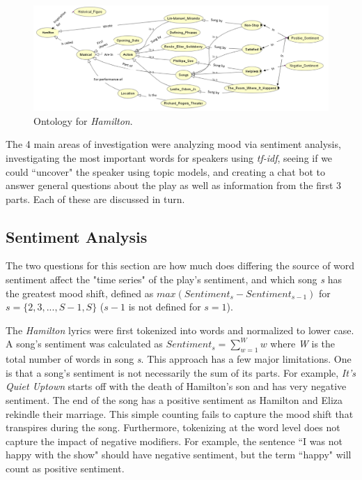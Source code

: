 \documentclass{article}
\begin{document}
\begin{figure}[h]
    \caption{Ontology for \emph{Hamilton}. \label{fig:ontology}}
    \centering
    \includegraphics[width=0.7\paperwidth, scale=1.25]{ontology.png}
\end{figure}

The 4 main areas of investigation were analyzing mood via sentiment analysis, investigating the most important words for speakers using \emph{tf-idf}, seeing if we could ``uncover" the speaker using topic models, and creating a chat bot to answer general questions about the play as well as information from the first 3 parts. Each of these are discussed in turn.

\subsection{Sentiment Analysis}

The two questions for this section are how much does differing the source of word sentiment affect the "time series" of the play's sentiment, and which song \emph{s} has the greatest mood shift, defined as $max(Sentiment_{s} - Sentiment_{s - 1})$ for $s = \{2, 3, ..., S - 1, S\}$ ($s - 1$ is not defined for $s = 1$).

The \emph{Hamilton} lyrics were first tokenized into words and normalized to lower case. A song's sentiment was calculated as $Sentiment_{s} = \sum_{w = 1}^{W}w$ where \emph{W} is the total number of words in song \emph{s}. This approach has a few major limitations. One is that a song's sentiment is not necessarily the sum of its parts. For example, \emph{It's Quiet Uptown} starts off with the death of Hamilton's son and has very negative sentiment. The end of the song has a positive sentiment as Hamilton and Eliza rekindle their marriage. This simple counting fails to capture the mood shift that transpires during the song. Furthermore, tokenizing at the word level does not capture the impact of negative modifiers. For example, the sentence ``I was not happy with the show" should have negative sentiment, but the term ``happy" will count as positive sentiment.
\end{document}
